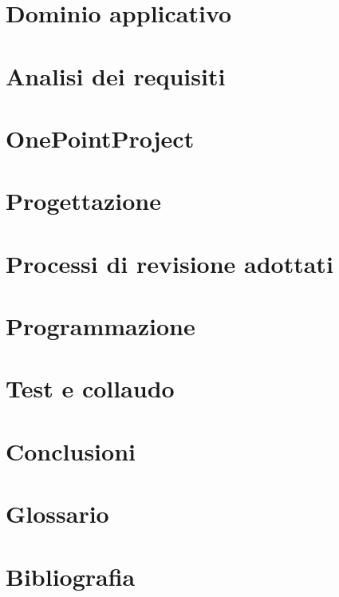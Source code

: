 
%

\def\INDICE		{true} 		%
\def\TABELLE	{true} 		%
\def\FIGURE		{true} 		%



\twocolumn

\newpage



\pagestyle{stilecapitolinumerati}

\section{Dominio applicativo}

\newpage

\section{Analisi dei requisiti}
\label{sec:analisi}

\newpage

\section{OnePointProject}

\newpage

\section{Progettazione}

\newpage

\section{Processi di revisione adottati}

\newpage

\section{Programmazione}

\newpage

\section{Test e collaudo}

\newpage

\section{Conclusioni}

\newpage

\pagestyle{stilecapitolinonnumerati}

\section*{Glossario}

\newpage

\section*{Bibliografia}

\newpage

